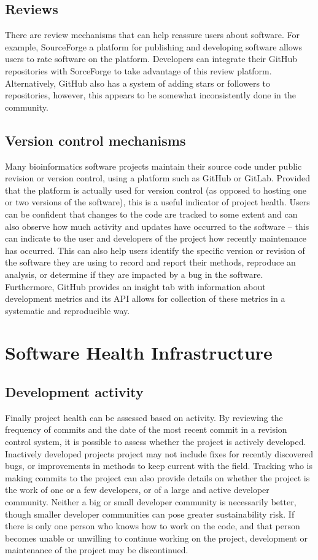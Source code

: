 \documentclass{article}
\begin{document}
\subsection{Reviews}
There are review mechanisms that can help reassure users about software. For example, SourceForge\cite{sourceforge} a platform for publishing and developing software allows users to rate software on the platform. Developers can integrate their GitHub repositories with SorceForge to take advantage of this review platform. Alternatively, GitHub also has a system of adding stars or followers to repositories, however, this appears to be somewhat inconsistently done in the community. 

\subsection{Version control mechanisms}
Many bioinformatics software projects maintain their source code under public revision or version control, using a platform such as GitHub or GitLab. Provided that the platform is actually used for version control (as opposed to hosting one or two versions of the software), this is a useful indicator of project health. Users can be confident that changes to the code are tracked to some extent and can also observe how much activity and updates have occurred to the software -- this can indicate to the user and developers of the project how recently maintenance has occurred. This can also help users identify the specific version or revision of the software they are using to record and report their methods, reproduce an analysis, or determine if they are impacted by a bug in the software. Furthermore, GitHub provides an insight tab with information about development metrics and its API allows for collection of these metrics in a systematic and reproducible way. 

\section{Software Health Infrastructure}
\label{sec-supp-note-health-inf}

\subsection{Development activity}
Finally project health can be assessed based on activity. By reviewing the frequency of commits and the date of the most recent commit in a revision control system, it is possible to assess whether the project is actively developed. Inactively developed projects project may not include fixes for recently discovered bugs, or improvements in methods to keep current with the field. Tracking who is making commits to the project can also provide details on whether the project is the work of one or a few developers, or of a large and active developer community. Neither a big or small developer community is necessarily better, though smaller developer communities can pose greater sustainability risk. If there is only one person who knows how to work on the code, and that person becomes unable or unwilling to continue working on the project, development or maintenance of the project may be discontinued. 
\end{document}
